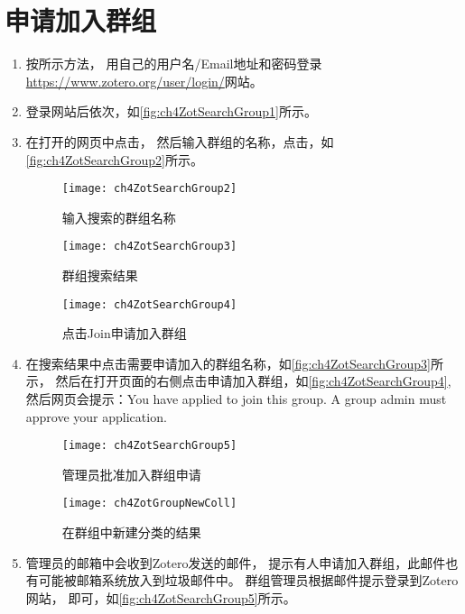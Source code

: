 \documentclass[theorem=false,mathfont=none,openany,sub3section]{easybook}
\begin{document}
\section{申请加入群组}\label{sec:joinGroup}
\begin{enumerate}
	\item 按所示方法，
	用自己的用户名/Email地址和密码登录\url{https://www.zotero.org/user/login/}网站。
	\item 登录网站后依次，如\autoref{fig:ch4ZotSearchGroup1}所示。
	\item 在打开的网页中点击，
	然后输入群组的名称，点击，如\autoref{fig:ch4ZotSearchGroup2}所示。
	
	
	\begin{figure}[t]
		\begin{minipage}[b]{\dimexpr.3\textwidth-1em}
			\centering
			\texttt{[image: ch4ZotSearchGroup2]}
			\caption{输入搜索的群组名称}
			\label{fig:ch4ZotSearchGroup2}
		\end{minipage}
		\begin{minipage}[b]{\dimexpr.3\textwidth-1em}
			\centering
			\texttt{[image: ch4ZotSearchGroup3]}
			\caption{群组搜索结果}
			\label{fig:ch4ZotSearchGroup3}
		\end{minipage}
		\begin{minipage}[b]{\dimexpr.4\textwidth-1em}
			\centering
			\texttt{[image: ch4ZotSearchGroup4]}
			\caption{点击Join申请加入群组}
			\label{fig:ch4ZotSearchGroup4}
		\end{minipage}
		
	\end{figure}
	\item 在搜索结果中点击需要申请加入的群组名称，如\autoref{fig:ch4ZotSearchGroup3}所示，
	然后在打开页面的右侧点击申请加入群组，如\autoref{fig:ch4ZotSearchGroup4},
	然后网页会提示：You have applied to join this group. A group admin must approve your application.
	\begin{figure}[htbp]
		\centering 
		\begin{minipage}[t]{0.6\linewidth}
			\centering
			\texttt{[image: ch4ZotSearchGroup5]}
			\caption{管理员批准加入群组申请}
			\label{fig:ch4ZotSearchGroup5}
		\end{minipage}
		\begin{minipage}[t]{0.3\linewidth}
			\centering
			\texttt{[image: ch4ZotGroupNewColl]}
			\caption{在群组中新建分类的结果}
			\label{fig:ch4ZotGroupNewColl}
		\end{minipage}
	\end{figure}
	
	\item 管理员的邮箱中会收到Zotero发送的邮件，
	提示有人申请加入群组，此邮件也有可能被邮箱系统放入到垃圾邮件中。
	群组管理员根据邮件提示登录到Zotero网站，
	即可，如\autoref{fig:ch4ZotSearchGroup5}所示。
\end{enumerate}
\end{document}
